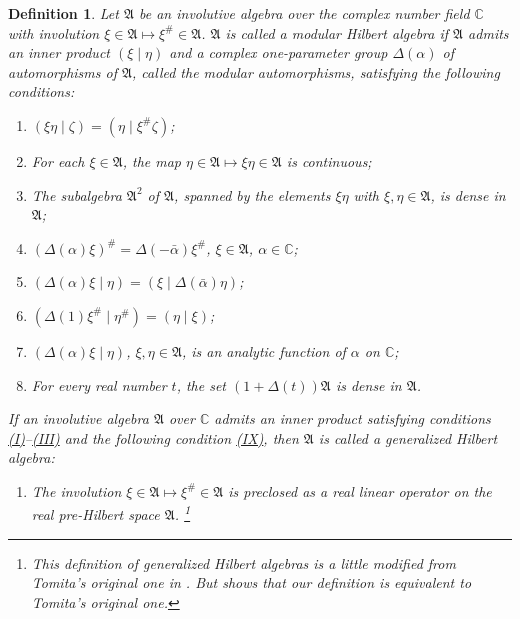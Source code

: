 \documentclass[12pt,b5paper,twoside]{article}
\theoremstyle{takesaki}
\newtheorem{definition}{Definition}[section]
\numberwithin{equation}{section}
\newcommand{\modcondref}[1]{\hyperref[cond:2.1:#1]{(#1)}}
\begin{document}
\begin{definition}\label{def:2.1}
Let $\mathfrak A$ be an involutive algebra over the complex number field
$\mathbb C$ with involution
$\xi\in\mathfrak A\longmapsto\xi^\#\in\mathfrak A$.
$\mathfrak A$ is called a \emph{modular Hilbert algebra} if $\mathfrak A$
admits an inner product $(\xi\mid\eta)$ and a complex one-parameter group
$\Delta(\alpha)$ of automorphisms of $\mathfrak A$, called the modular
automorphisms, satisfying the following conditions:
\begin{enumerate}[label=(\Roman*)]
  \item\label{cond:2.1:I} $(\xi\eta\mid\zeta)=(\eta\mid\xi^\#\zeta)$;
  \item\label{cond:2.1:II} For each $\xi\in\mathfrak A$, the map
  $\eta\in\mathfrak A\longmapsto\xi\eta\in\mathfrak A$ is continuous;

  \item\label{cond:2.1:III} The subalgebra $\mathfrak A^2$ of $\mathfrak A$, spanned by the
  elements $\xi\eta$ with $\xi,\eta\in\mathfrak A$, is dense in
  $\mathfrak A$;
  \item\label{cond:2.1:IV} $(\Delta(\alpha)\xi)^\#=\Delta(-\bar\alpha)\xi^\#$,
  $\xi\in\mathfrak A$, $\alpha\in\mathbb C$;
  \item\label{cond:2.1:V} $(\Delta(\alpha)\xi\mid\eta)
  =(\xi\mid\Delta(\bar\alpha)\eta)$;
  \item\label{cond:2.1:VI} $(\Delta(1)\xi^\#\mid\eta^\#)=(\eta\mid\xi)$;
  \item\label{cond:2.1:VII} $(\Delta(\alpha)\xi\mid\eta)$, $\xi,\eta\in\mathfrak A$, is an
  analytic function of $\alpha$ on $\mathbb C$;
  \item\label{cond:2.1:VIII} For every real number $t$, the set
  $(1+\Delta(t))\mathfrak A$ is dense in $\mathfrak A$.
\end{enumerate}
If an involutive algebra $\mathfrak A$ over $\mathbb C$ admits an inner
product satisfying conditions \modcondref{I}--\modcondref{III} and the following condition
\modcondref{IX}, then $\mathfrak A$ is called a \emph{generalized Hilbert algebra}:
\begin{enumerate}[label=(IX)]
  \item\label{cond:2.1:IX} The involution
  $\xi\in\mathfrak A\longmapsto\xi^\#\in\mathfrak A$ is preclosed as a
  real linear operator on the real pre-Hilbert space $\mathfrak A$.
  \footnote{This definition of generalized Hilbert algebras is a little
  modified from Tomita's original one in \cite{ref22}.  But
   shows that our definition is equivalent to Tomita's
  original one.}
\end{enumerate}
\end{definition}
\end{document}
